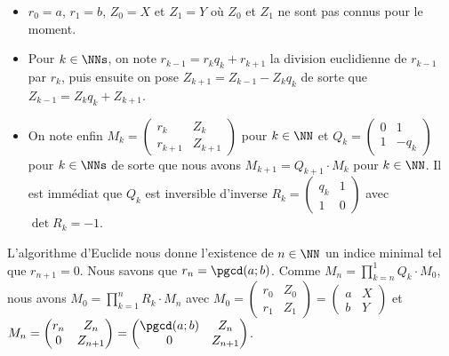 \begin{itemize}[label=\small\textbullet]
	\item $r_0 = a$, $r_1 = b$, $Z_0 = X$ et $Z_1 = Y$ où $Z_0$ et $Z_1$ ne sont pas connus pour le moment.

	\item Pour $k \in \NNs$, on note $r_{k-1} = r_k q_k + r_{k+1}$ la division euclidienne de $r_{k-1}$ par $r_k$, puis ensuite on pose $Z_{k+1} = Z_{k-1} - Z_k q_k$ de sorte que $Z_{k-1} = Z_k q_k + Z_{k+1}$.

	\item On note enfin
	      $M_k 
           =
           \begin{pmatrix}
          	  r_k     & Z_k     \\ 
          	  r_{k+1} & Z_{k+1}
           \end{pmatrix}$
          pour $k \in \NN$ et
	      $Q_k 
           =
           \begin{pmatrix}
          	  0 & 1     \\ 
          	  1 & - q_k
           \end{pmatrix}$
          pour $k \in \NNs$ de sorte que nous avons $M_{k+1} = Q_{k+1} \cdot M_k$ pour $k \in \NN$. Il est immédiat que $Q_k$ est inversible d'inverse
	      $R_k 
           =
           \begin{pmatrix}
          	  q_k & 1 \\ 
          	  1   & 0
           \end{pmatrix}$
          avec $\det R_k = -1$.
\end{itemize}


L'algorithme d'Euclide nous donne l'existence de $n \in \NN$ un indice minimal tel que $r_{n+1} = 0$.
Nous savons que $r_n = \pgcd(a ; b)$.
Comme
$\displaystyle M_n = \prod_{k = n}^{1} Q_k \cdot M_0$,
nous avons
$\displaystyle M_0 = \prod_{k = 1}^{n} R_k \cdot M_n$
avec
$M_0
 =
 \begin{pmatrix}
    r_0 & Z_0 \\ 
    r_1 & Z_1
 \end{pmatrix}
 =
 \begin{pmatrix}
    a & X \\ 
    b & Y
 \end{pmatrix}$
et
$M_n
 =
 \begin{pmatrix}
    r_n & Z_n     \\ 
    0   & Z_{n+1}
 \end{pmatrix}
 =
 \begin{pmatrix}
    \pgcd(a ; b) & Z_n     \\ 
    0            & Z_{n+1}
 \end{pmatrix}$.
 
